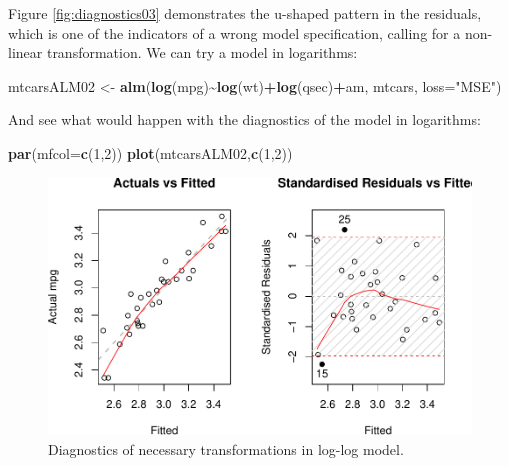 \documentclass[
]{book}
\newenvironment{Shaded}{\begin{snugshade}}{\end{snugshade}}
\newcommand{\AttributeTok}[1]{\textcolor[rgb]{0.13,0.29,0.53}{#1}}
\newcommand{\DecValTok}[1]{\textcolor[rgb]{0.00,0.00,0.81}{#1}}
\newcommand{\FunctionTok}[1]{\textcolor[rgb]{0.13,0.29,0.53}{\textbf{#1}}}
\newcommand{\NormalTok}[1]{#1}
\newcommand{\OtherTok}[1]{\textcolor[rgb]{0.56,0.35,0.01}{#1}}
\newcommand{\SpecialCharTok}[1]{\textcolor[rgb]{0.81,0.36,0.00}{\textbf{#1}}}
\newcommand{\StringTok}[1]{\textcolor[rgb]{0.31,0.60,0.02}{#1}}
\theoremstyle{definition}
\theoremstyle{definition}
\theoremstyle{definition}
\theoremstyle{definition}
\theoremstyle{remark}
\begin{document}
Figure \ref{fig:diagnostics03} demonstrates the u-shaped pattern in the residuals, which is one of the indicators of a wrong model specification, calling for a non-linear transformation. We can try a model in logarithms:

\begin{Shaded}
\begin{Highlighting}[]
\NormalTok{mtcarsALM02 }\OtherTok{\textless{}{-}} \FunctionTok{alm}\NormalTok{(}\FunctionTok{log}\NormalTok{(mpg)}\SpecialCharTok{\textasciitilde{}}\FunctionTok{log}\NormalTok{(wt)}\SpecialCharTok{+}\FunctionTok{log}\NormalTok{(qsec)}\SpecialCharTok{+}\NormalTok{am, mtcars, }\AttributeTok{loss=}\StringTok{"MSE"}\NormalTok{)}
\end{Highlighting}
\end{Shaded}

And see what would happen with the diagnostics of the model in logarithms:

\begin{Shaded}
\begin{Highlighting}[]
\FunctionTok{par}\NormalTok{(}\AttributeTok{mfcol=}\FunctionTok{c}\NormalTok{(}\DecValTok{1}\NormalTok{,}\DecValTok{2}\NormalTok{))}
\FunctionTok{plot}\NormalTok{(mtcarsALM02,}\FunctionTok{c}\NormalTok{(}\DecValTok{1}\NormalTok{,}\DecValTok{2}\NormalTok{))}
\end{Highlighting}
\end{Shaded}

\begin{figure}
\centering
\includegraphics{Svetunkov---Statistics-for-Business-Analytics_files/figure-latex/diagnostics04-1.pdf}
\caption{\label{fig:diagnostics04}Diagnostics of necessary transformations in log-log model.}
\end{figure}
\end{document}
